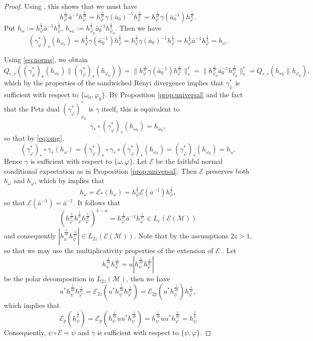 \documentclass[12pt]{article}
\theoremstyle{definition}
\theoremstyle{remark}
\numberwithin{equation}{section}
\def\Me{\mathcal M}
\begin{document}
\begin{proof}
Using \cite[Lemma 5.1]{fack1986generalized}, this shows that we must have 
\[
h_\varphi^{\frac{1}{2r}}\bar a^{-1}h_\varphi^{\frac{1}{2r}}=
h_\varphi^{\frac{1}{2r}}\gamma(\bar a_0)^{-1}h_\varphi^{\frac{1}{2r}}=
h_\varphi^{\frac{1}{2r}}\gamma(\bar a_0^{-1})h_\varphi^{\frac{1}{2r}}.
\]
Put $h_\omega:= h_\varphi^{\frac12} \bar a^{-1} h_\varphi^{\frac12}$,
$h_{\omega_0}:=h_{\varphi_0}^{\frac12} \bar a_0^{-1} h_{\varphi_0}^{\frac12}$.
Then we have
\begin{equation}\label{eq:omg}
(\gamma_\varphi^*)_* (h_{\omega_0})=h_\varphi^{\frac12}\gamma(\bar
a_0^{-1})h_\varphi^{\frac12}=h_\varphi^{\frac12}\gamma(\bar
a_0)^{-1}h_\varphi^{\frac12}=h_\varphi^{\frac12}\bar a^{-1}h_\varphi^{\frac12}=h_\omega.
\end{equation}

Using \eqref{eq:norms}, we obtain
\[
Q_{r,r}((\gamma_\varphi^*)_*(h_{\omega_0})\|(\gamma_\varphi^*)_*(h_{\varphi_0}))=\|h_\varphi^{\frac{1}{2r}}\gamma(\bar a_0^{-1})h_\varphi^{\frac{1}{2r}}\|_r^r=\|h_{\varphi_0}^{\frac{1}{2r}}\bar
a_0^{-1}h_{\varphi_0}^{\frac{1}{2r}}\|_r^r=Q_{r,r}(h_{\omega_0}\|h_{\varphi_0}),
\]
which by the properties of the sandwiched R\'enyi divergence \cite[Thm.
]{jencova2018renyi} implies that $\gamma_\varphi^*$ is sufficient with respect to
$\{\omega_0,\varphi_0\}$. By Proposition \ref{prop:universal} and the fact that the
Petz dual  $(\gamma_\varphi^*)_{\varphi_0}^*$ is $\gamma$ itself, this  is equivalent to 
\[
\gamma_*\circ (\gamma_\varphi^*)_*(h_{\omega_0})=h_{\omega_0},
\]
so that  by \eqref{eq:omg},
\[
(\gamma_\varphi^*)_*\circ \gamma_*(h_\omega)=(\gamma_\varphi^*)_*\circ
\gamma_*\circ
(\gamma_\varphi^*)_*(h_{\omega_0})=(\gamma_\varphi^*)_*(h_{\omega_0})=h_\omega.
\]
Hence $\gamma$ is sufficient with respect to $\{\omega,\varphi\}$. Let $\mathcal E$ be the
faithful normal conditional expectation as in Proposition \ref{prop:universal}. Then
$\mathcal E$ preserves both $h_\omega$ and $h_\varphi$, which by
\cite{junge2003noncommutative} implies that 
\[
h_\omega=\mathcal E_*(h_\omega)=h_\varphi^{\frac12}\mathcal E(\bar a^{-1}) h_\varphi^{\frac12},
\]
so that $\mathcal E(\bar a^{-1})=\bar a^{-1}$. It follows that 
\[
\left(h_\varphi^{\frac1{2r}}h_\psi^{\frac1{p}}h_\varphi^{\frac1{2r}}\right)^{1-\alpha}=
h_\varphi^{\frac1{2r}}\bar a^{-1}h_\varphi^{\frac1{2r}}\in L_r(\mathcal E(\Me))
\]
and consequently $|h_\psi^{\frac1{2p}}h_\varphi^{\frac1{2r}}|\in L_{2z}(\mathcal E(\Me))$.
Note that by the assumptions $2z>1$, so that we may use the multiplicativity properties
of the extension of $\mathcal E$ \cite{junge2003noncommutative}. Let 
\[
h_\psi^{\frac1{2p}}h_\varphi^{\frac1{2r}}=u|h_\psi^{\frac1{2p}}h_\varphi^{\frac1{2r}}|
\]
be the polar decomposition in $L_{2z}(\Me)$, then we have 
\[
u^*h_\psi^{\frac1{2p}}h_\varphi^{\frac1{2r}}=\mathcal
E_{2z}(u^*h_\psi^{\frac1{2p}}h_\varphi^{\frac1{2r}})=\mathcal
E_{2p}(u^*h_\psi^{\frac1{2p}})h_\varphi^{\frac1{2r}},
\]
which implies that 
\[
\mathcal E_p(h_\psi^{\frac1p})=\mathcal
E_p(h_\psi^{\frac1{2p}}uu^*h_\psi^{\frac1{2p}})=h_\psi^{\frac1{2p}}uu^*h_\psi^{\frac1{2p}}=h_\psi^{\frac1{p}}
\]
Consequently, $\psi\circ\mathcal E=\psi$ and $\gamma$ is sufficient with respect to
$\{\psi,\varphi\}$. 


\end{proof}
\end{document}
